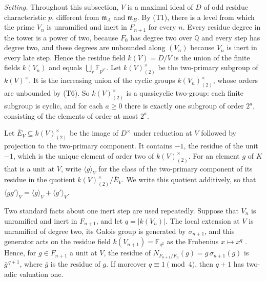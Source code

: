 \documentclass[11pt]{article}
\theoremstyle{plain}
\theoremstyle{definition}
\theoremstyle{remark}
\newcommand{\Q}{\mathbb Q}
\newcommand{\F}{\mathbb F}
\newcommand{\EA}{\mathfrak m_A}
\newcommand{\EB}{\mathfrak m_B}
\begin{document}
\emph{Setting.}  Throughout this subsection, $V$ is a maximal ideal of $D$
of odd residue characteristic $p$, different from $\EA$ and $\EB$.  By
(T1), there is a level from which the prime $V_n$ is unramified and inert
in $F_{n+1}$ for every $n$.  Every residue degree in the tower is a power
of two, because $F_0$ has degree two over $\Q$ and every step has degree
two, and these degrees are unbounded along $(V_n)$ because $V_n$ is inert
in every late step.  Hence the residue field
$k(V)=D/V$ is the union of the finite fields $k(V_n)$ and equals
$\bigcup_r\F_{p^{2^r}}$.  Let $k(V)^\times_{(2)}$ be the two-primary
subgroup of $k(V)^\times$.  It is the increasing union of the cyclic
groups $k(V_n)^\times_{(2)}$, whose orders are unbounded by (T6).  So
$k(V)^\times_{(2)}$ is a quasicyclic two-group: each finite subgroup is
cyclic, and for each $a\geq0$ there is exactly one subgroup of order
$2^a$, consisting of the elements of order at most $2^a$.

Let $\overline E_V\subseteq k(V)^\times_{(2)}$ be the image of $D^\times$
under reduction at $V$ followed by projection to the two-primary
component.  It contains $-1$, the residue of the unit $-1$, which is the
unique element of order two of $k(V)^\times_{(2)}$.  For an element $g$
of $K$ that is a unit at $V$, write $\langle g\rangle_V$ for the class of the
two-primary component of its residue in the quotient
$k(V)^\times_{(2)}/\overline E_V$.  We write this quotient additively, so
that $\langle gg'\rangle_V=\langle g\rangle_V+\langle g'\rangle_V$.

Two standard facts about one inert step are used repeatedly.  Suppose
that $V_n$ is unramified and inert in $F_{n+1}$, and let
$q=|k(V_n)|$.  The local extension at $V$ is unramified of degree two,
its Galois group is generated by $\sigma_{n+1}$, and this generator acts
on the residue field $k(V_{n+1})=\F_{q^2}$ as the Frobenius $x\mapsto x^q$
\cite[Propositions~7.50(b) and~8.10]{MilneANT}.  Hence, for $g\in F_{n+1}$
a unit at $V$, the residue of $N_{F_{n+1}/F_n}(g)=g\,\sigma_{n+1}(g)$ is
$\bar g^{\,q+1}$, where $\bar g$ is the residue of $g$.  If moreover
$q\equiv1\pmod4$, then $q+1$ has two-adic valuation one.
\end{document}

